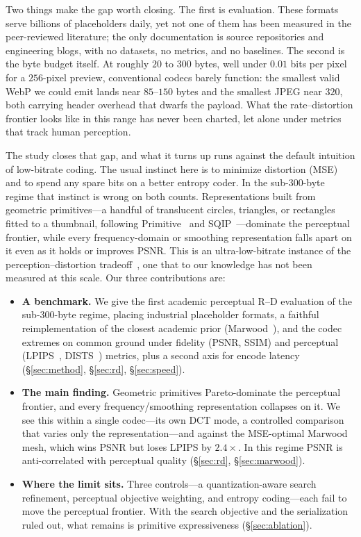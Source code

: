\documentclass[11pt]{article}
\begin{document}
Two things make the gap worth closing. The first is evaluation. These formats
serve billions of placeholders daily, yet not one of them has been measured in
the peer-reviewed literature; the only documentation is source repositories and
engineering blogs, with no datasets, no metrics, and no baselines. The second
is the byte budget itself. At roughly $20$ to $300$ bytes, well under $0.01$
bits per pixel for a $256$-pixel preview, conventional codecs barely function:
the smallest valid WebP we could emit lands near $85$--$150$ bytes and the
smallest JPEG near $320$, both carrying header overhead that dwarfs the payload.
What the rate--distortion frontier looks like in this range has never been
charted, let alone under metrics that track human perception.

The study closes that gap, and what it turns up runs against the default
intuition of low-bitrate coding. The usual instinct here is to minimize
distortion (MSE) and to spend any spare bits on a better entropy coder. In the
sub-300-byte regime that instinct is wrong on both counts. Representations built
from geometric primitives---a handful of translucent circles, triangles, or
rectangles fitted to a thumbnail, following Primitive~\cite{primitive} and
SQIP~\cite{sqip}---dominate the perceptual frontier, while every
frequency-domain or smoothing representation falls apart on it even as it holds
or improves PSNR. This is an ultra-low-bitrate instance of the
perception--distortion tradeoff~\cite{blau2018perception,rdp}, one that to our
knowledge has not been measured at this scale. Our three contributions are:

\begin{itemize}
  \item \textbf{A benchmark.} We give the first academic perceptual R--D
  evaluation of the sub-300-byte regime, placing industrial placeholder formats,
  a faithful reimplementation of the closest academic prior
  (Marwood~\cite{marwood}), and the codec extremes on common ground under
  fidelity (PSNR, SSIM) and perceptual (LPIPS~\cite{lpips}, DISTS~\cite{dists})
  metrics, plus a second axis for encode latency (\S\ref{sec:method},
  \S\ref{sec:rd}, \S\ref{sec:speed}).
  \item \textbf{The main finding.} Geometric primitives Pareto-dominate the
  perceptual frontier, and every frequency/smoothing representation collapses on
  it. We see this within a single codec---its own DCT mode, a controlled
  comparison that varies only the representation---and against the MSE-optimal
  Marwood~\cite{marwood} mesh, which wins PSNR but loses LPIPS by $2.4\times$.
  In this regime PSNR is anti-correlated with perceptual quality
  (\S\ref{sec:rd}, \S\ref{sec:marwood}).
  \item \textbf{Where the limit sits.} Three controls---a quantization-aware
  search refinement, perceptual objective weighting, and entropy coding---each
  fail to move the perceptual frontier. With the search objective and the
  serialization ruled out, what remains is primitive expressiveness
  (\S\ref{sec:ablation}).
\end{itemize}
\end{document}
